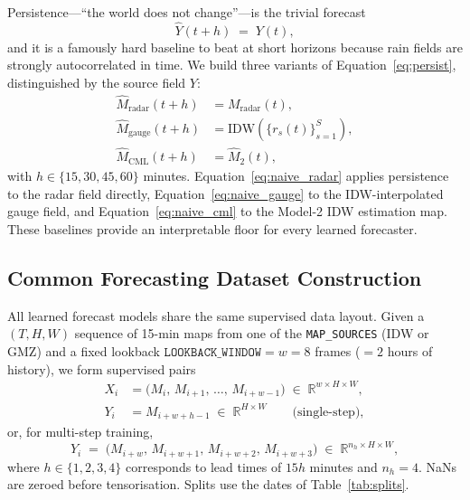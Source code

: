 \documentclass[12pt, a4paper]{article}
\begin{document}
Persistence---``the world does not change''---is the trivial forecast
\begin{equation}
  \hat{Y}(t+h) \;=\; Y(t), \label{eq:persist}
\end{equation}
and it is a famously hard baseline to beat at short horizons because
rain fields are strongly autocorrelated in time. We build three
variants of Equation~\eqref{eq:persist}, distinguished by the source
field \(Y\):
\begin{align}
  \hat{M}_{\text{radar}}(t+h) &= M_{\text{radar}}(t), \label{eq:naive_radar} \\
  \hat{M}_{\text{gauge}}(t+h) &= \mathrm{IDW}\!\left(\{r_s(t)\}_{s=1}^{S}\right), \label{eq:naive_gauge} \\
  \hat{M}_{\text{CML}}(t+h)   &= \hat{M}_{2}(t), \label{eq:naive_cml}
\end{align}
with \(h \in \{15, 30, 45, 60\}\) minutes. Equation~\eqref{eq:naive_radar}
applies persistence to the radar field directly,
Equation~\eqref{eq:naive_gauge} to the IDW-interpolated gauge field, and
Equation~\eqref{eq:naive_cml} to the Model-2 IDW estimation map. These
baselines provide an interpretable floor for every learned forecaster.

\subsection{Common Forecasting Dataset Construction}\label{sec:fcst_data}

All learned forecast models share the same supervised data layout.
Given a \((T, H, W)\) sequence of 15-min maps from one of the
\texttt{MAP\_SOURCES} (IDW or GMZ) and a fixed lookback
\(\texttt{LOOKBACK\_WINDOW} = w = 8\) frames (\(=2\) hours of
history), we form supervised pairs
\begin{align}
  X_i &= \bigl(M_{i},\, M_{i+1},\, \ldots,\, M_{i+w-1}\bigr) \;\in\; \mathbb{R}^{w\times H\times W}, \\
  Y_i &= M_{i+w+h-1} \;\in\; \mathbb{R}^{H\times W} \qquad \text{(single-step)},
\end{align}
or, for multi-step training,
\begin{equation}
  Y_i \;=\; \bigl(M_{i+w},\, M_{i+w+1},\, M_{i+w+2},\, M_{i+w+3}\bigr) \;\in\; \mathbb{R}^{n_h\times H\times W},
\end{equation}
where \(h \in \{1, 2, 3, 4\}\) corresponds to lead times of
\(15h\) minutes and \(n_h = 4\). NaNs are zeroed before
tensorisation. Splits use the dates of Table~\ref{tab:splits}.
\end{document}

